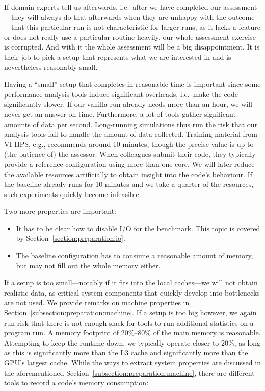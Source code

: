 If domain experts tell us afterwards, i.e.~after we have completed our assessment---they will always do that afterwards
    when they are unhappy with the outcome---that this particular run is not
    characteristic for larger runs, as it lacks a feature or does not really use a particular routine
    heavily, our whole assessment exercise is corrupted.
And with it the whole assessment will be a big disappointment. 
It is their job to pick a setup that represents what we are interested in and is nevertheless reasonably small.


Having a ``small'' setup that completes in reasonable time is important since some performance analysis
    tools induce significant overheads, i.e.~make the code significantly slower.
    If our vanilla run already needs more than an hour, we will never get an
    answer on time. Furthermore, a lot of tools gather significant amounts of
    data per second. Long-running simulations thus run the risk that our analysis
    tools fail to handle the amount of data collected.
Training material from VI-HPS, e.g., recommends around 10 minutes, though the precise value is up to (the patience of) the assessor.
When colleagues submit their code, they typically provide a reference configuration using more than one core.
We will later reduce the available resources artificially to obtain insight into the code's behaviour.
If the baseline already runs for 10 minutes and we take a quarter of the resources, such experiments quickly become infeasible.


Two more properties are important: 


\begin{itemize}
  \item It has to be clear how to disable I/O for the benchmark. This topic is covered by Section~\ref{section:preparation:io}.
  \item The baseline configuration has to consume a reasonable amount of memory, but may not fill out the whole memory either.
\end{itemize}


\noindent
If a setup is too small---notably if it fits into the local caches---we will not obtain realistic data, as critical system components that quickly develop into bottlenecks are not used.
We provide remarks on machine properties in Section~\ref{subsection:preparation:machine}.
If a setup is too big however, we again run risk that there is not enough slack for tools to run additional statistics on a program run.
A memory footprint of 20\%--80\% of the main memory is reasonable.
Attempting to keep the runtime down, we typically operate closer to 20\%, as long as this is significantly more than the L3 cache and significantly more than the GPU's largest cache.  
While the ways to extract system properties are discussed in the aforementioned Section~\ref{subsection:preparation:machine}, there are different tools to record a code's memory consumption:



